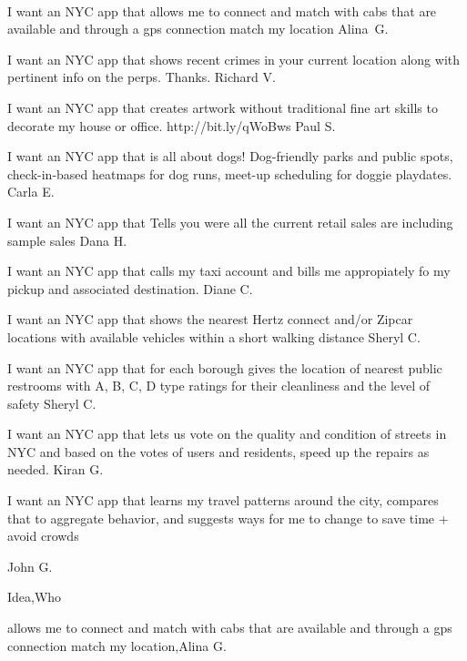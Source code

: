 \documentclass{article}
\begin{document}
\paragraph{} I want an NYC app  that allows me to connect and match with cabs that are available and through a  gps connection match my location Alina\ G.

I want an NYC app that shows recent crimes in your current location along with pertinent info on the perps. Thanks.  Richard V.

I want an NYC app that creates artwork without traditional fine art skills to decorate my house or office. http://bit.ly/qWoBws  Paul S.

I want an NYC app that is all about dogs! Dog-friendly parks and public spots, check-in-based heatmaps for dog runs, meet-up scheduling for doggie playdates.  Carla E.

 I want an NYC app that Tells you were all the current retail sales are including sample sales  Dana H.

I want an NYC app that calls my taxi account and bills me appropiately fo my pickup and associated destination.  Diane C.

I want an NYC app that shows the nearest Hertz connect and/or Zipcar locations with available vehicles within a short walking distance   Sheryl C.

 I want an NYC app that for each borough gives the location of nearest public restrooms with A, B, C, D type ratings for their cleanliness and the level of safety     Sheryl C.

 I want an NYC app that lets us vote on the quality and condition of streets in NYC and based on the votes of users and residents, speed up the repairs as needed.  Kiran G.

  I want an NYC app that learns my travel patterns around the city, compares that to aggregate behavior, and suggests ways for me to change to save time + avoid crowds

John G.

Idea,Who

allows me to connect and match with cabs that are available and through a gps connection match my location,Alina G.
\end{document}
